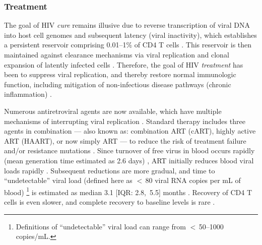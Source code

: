 \subsubsection{Treatment}\label{intro.hiv.resp.treat}
The goal of HIV \emph{cure} remains illusive due to
reverse transcription of viral DNA into host cell genomes and subsequent latency (viral inactivity),
which establishes a persistent reservoir comprising 0.01--1\% of CD4 T cells \cite{Ndungu2019}.
This reservoir is then maintained against clearance mechanisms via
viral replication and clonal expansion of latently infected cells
\cite{Maartens2014,Ndungu2019}.
Therefore, the goal of HIV \emph{treatment} has been to suppress viral replication,
and thereby restore normal immunologic function,
including mitigation of non-infectious disease pathways (\eg chronic inflammation)
\cite{Phillips2008,Deeks2015,Cihlar2016}.
\par
Numerous antiretroviral agents are now available,
which have multiple mechanisms of interrupting viral replication \cite{Maartens2014,WHO2016art}.
Standard therapy includes three agents in combination
--- also known as: combination ART (cART), highly active ART (HAART), or now simply ART ---
to reduce the risk of treatment failure and/or resistance mutations \cite{WHO2016art}.
Since turnover of free virus in blood occurs rapidly
(mean generation time estimated as 2.6 days) \cite{Perelson1996},
ART initially reduces blood viral loads rapidly \cite{Perelson1997,Maartens2014}.
Subsequent reductions are more gradual, and time to ``undetectable'' viral load
(defined here as $<$\,80 viral RNA copies per mL of blood)%
\footnote{Definitions of ``undetectable'' viral load can range from $<$\,50--1000 copies/mL.}
is estimated as median 3.1 [IQR: 2.8,~5.5] months \cite{Mujugira2016}.
Recovery of CD4 T cells is even slower, and complete recovery to baseline levels is rare
\cite{Battegay2006,Maartens2014}.
